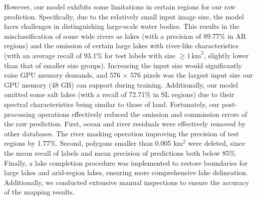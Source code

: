 \documentclass[preprint,12pt,authoryear]{elsarticle}
\begin{document}
However, our model exhibits some limitations in certain regions for our raw prediction. Specifically, due to the relatively small input image size, the model faces challenges in distinguishing large-scale water bodies. This results in the misclassification of some wide rivers as lakes (with a precision of 89.77\% in AR regions) and the omission of certain large lakes with river-like characteristics (with an average recall of 93.1\% for test labels with size $\ge 1\, \text{km}^2$, slightly lower than that of smaller size groups). Increasing the input size would significantly raise GPU memory demands, and 576 × 576 pixels was the largest input size our GPU memory (48 GB) can support during training. Additionally, our model omitted some salt lakes (with a recall of 72.71\% in SL regions) due to their spectral characteristics being similar to those of land. Fortunately, our post-processing operations effectively reduced the omission and commission errors of the raw prediction. First, ocean and river residuals were effectively removed by other databases. The river masking operation improving the precision of test regions by 1.77\%. Second, polygons smaller than 0.005 km$^2$ were deleted, since the mean recall of labels and mean precision of predictions both below 85\%. Finally, a lake completion procedure was implemented to restore boundaries for large lakes and arid-region lakes, ensuring more comprehensive lake delineation. Additionally, we conducted extensive manual inspections to ensure the accuracy of the mapping results.
\end{document}
